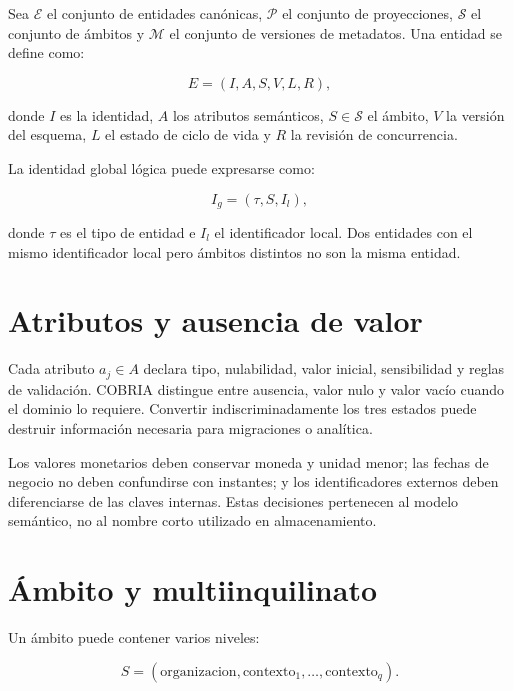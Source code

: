 Sea $\mathcal{E}$ el conjunto de entidades canónicas, $\mathcal{P}$ el conjunto de
proyecciones, $\mathcal{S}$ el conjunto de ámbitos y $\mathcal{M}$ el conjunto de
versiones de metadatos. Una entidad se define como:

\begin{equation}
E=(I,A,S,V,L,R),
\label{eq:entidad}
\end{equation}

donde $I$ es la identidad, $A$ los atributos semánticos, $S\in\mathcal{S}$ el ámbito,
$V$ la versión del esquema, $L$ el estado de ciclo de vida y $R$ la revisión de
concurrencia.

La identidad global lógica puede expresarse como:

\begin{equation}
I_g=(\tau,S,I_l),
\end{equation}

donde $\tau$ es el tipo de entidad e $I_l$ el identificador local. Dos entidades con el
mismo identificador local pero ámbitos distintos no son la misma entidad.

\section{Atributos y ausencia de valor}

Cada atributo $a_j\in A$ declara tipo, nulabilidad, valor inicial, sensibilidad y reglas
de validación. COBRIA distingue entre ausencia, valor nulo y valor vacío cuando el
dominio lo requiere. Convertir indiscriminadamente los tres estados puede destruir
información necesaria para migraciones o analítica.

Los valores monetarios deben conservar moneda y unidad menor; las fechas de negocio no
deben confundirse con instantes; y los identificadores externos deben diferenciarse de
las claves internas. Estas decisiones pertenecen al modelo semántico, no al nombre corto
utilizado en almacenamiento.

\section{Ámbito y multiinquilinato}

Un ámbito puede contener varios niveles:

\begin{equation}
S=(\mathrm{organizacion},\mathrm{contexto}_1,\ldots,\mathrm{contexto}_q).
\end{equation}

